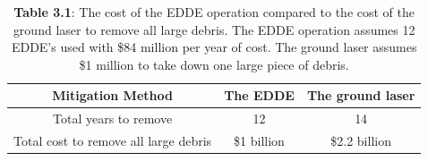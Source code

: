 \documentclass{article}
\theoremstyle{plain}			%
\theoremstyle{definition}		%
\theoremstyle{remark}
\numberwithin{equation}{section}
\numberwithin{figure}{section}
\numberwithin{table}{section}
\begin{document}
\begin{table}[H]
\centering
\begin{tabular}{| c | c  | c | }
\hline
Mitigation Method & The EDDE & The ground laser \\
\hline
Total years to remove & 12 & 14 \\
\hline
Total cost to remove all large debris & \$1 billion & \$2.2 billion \\
\hline
\end{tabular}
\caption*{\small{\textbf{Table 3.1}: The cost of the EDDE operation compared to the cost of the ground laser to remove all large debris.  The EDDE operation assumes 12 EDDE's used with \$84 million per year of cost. The ground laser assumes \$1 million to take down one large piece of debris.}}
\label{EDDEtab1}
\end{table}
\end{document}
